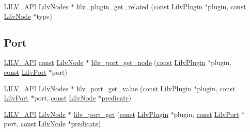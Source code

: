 \begin{DoxyCompactItemize}
\item 
\hyperlink{lilv_8h_aa5182eee7ddff96862d0171967ee6f77}{L\+I\+L\+V\+\_\+\+A\+PI} \hyperlink{lilv_8h_a256c2c4443307f320de24bb31198df83}{Lilv\+Nodes} $\ast$ \hyperlink{group__lilv_ga6070a384fbd949ec78ae7a8e323139f9}{lilv\+\_\+plugin\+\_\+get\+\_\+related} (\hyperlink{getopt1_8c_a2c212835823e3c54a8ab6d95c652660e}{const} \hyperlink{lilv_8h_a94e36303167a78a0c392f881136b461b}{Lilv\+Plugin} $\ast$plugin, \hyperlink{getopt1_8c_a2c212835823e3c54a8ab6d95c652660e}{const} \hyperlink{lilv_8h_ae183dca3dca5368d34dbd863a405437b}{Lilv\+Node} $\ast$type)
\end{DoxyCompactItemize}
\subsection*{Port}
\begin{DoxyCompactItemize}
\item 
\hyperlink{lilv_8h_aa5182eee7ddff96862d0171967ee6f77}{L\+I\+L\+V\+\_\+\+A\+PI} \hyperlink{getopt1_8c_a2c212835823e3c54a8ab6d95c652660e}{const} \hyperlink{lilv_8h_ae183dca3dca5368d34dbd863a405437b}{Lilv\+Node} $\ast$ \hyperlink{group__lilv_ga2b4217e2ea80059580f62f163b5a2df5}{lilv\+\_\+port\+\_\+get\+\_\+node} (\hyperlink{getopt1_8c_a2c212835823e3c54a8ab6d95c652660e}{const} \hyperlink{lilv_8h_a94e36303167a78a0c392f881136b461b}{Lilv\+Plugin} $\ast$plugin, \hyperlink{getopt1_8c_a2c212835823e3c54a8ab6d95c652660e}{const} \hyperlink{lilv_8h_a772dad64b72690372c1f78314012bda5}{Lilv\+Port} $\ast$port)
\item 
\hyperlink{lilv_8h_aa5182eee7ddff96862d0171967ee6f77}{L\+I\+L\+V\+\_\+\+A\+PI} \hyperlink{lilv_8h_a256c2c4443307f320de24bb31198df83}{Lilv\+Nodes} $\ast$ \hyperlink{group__lilv_ga60b499a485768d393e702f360b79e7f8}{lilv\+\_\+port\+\_\+get\+\_\+value} (\hyperlink{getopt1_8c_a2c212835823e3c54a8ab6d95c652660e}{const} \hyperlink{lilv_8h_a94e36303167a78a0c392f881136b461b}{Lilv\+Plugin} $\ast$plugin, \hyperlink{getopt1_8c_a2c212835823e3c54a8ab6d95c652660e}{const} \hyperlink{lilv_8h_a772dad64b72690372c1f78314012bda5}{Lilv\+Port} $\ast$port, \hyperlink{getopt1_8c_a2c212835823e3c54a8ab6d95c652660e}{const} \hyperlink{lilv_8h_ae183dca3dca5368d34dbd863a405437b}{Lilv\+Node} $\ast$\hyperlink{xlmath_8c_a767c5fa064d0a1e1f8b447769f1a890b}{predicate})
\item 
\hyperlink{lilv_8h_aa5182eee7ddff96862d0171967ee6f77}{L\+I\+L\+V\+\_\+\+A\+PI} \hyperlink{lilv_8h_ae183dca3dca5368d34dbd863a405437b}{Lilv\+Node} $\ast$ \hyperlink{group__lilv_ga478aacf9e903d75e219d8b7933033899}{lilv\+\_\+port\+\_\+get} (\hyperlink{getopt1_8c_a2c212835823e3c54a8ab6d95c652660e}{const} \hyperlink{lilv_8h_a94e36303167a78a0c392f881136b461b}{Lilv\+Plugin} $\ast$plugin, \hyperlink{getopt1_8c_a2c212835823e3c54a8ab6d95c652660e}{const} \hyperlink{lilv_8h_a772dad64b72690372c1f78314012bda5}{Lilv\+Port} $\ast$port, \hyperlink{getopt1_8c_a2c212835823e3c54a8ab6d95c652660e}{const} \hyperlink{lilv_8h_ae183dca3dca5368d34dbd863a405437b}{Lilv\+Node} $\ast$\hyperlink{xlmath_8c_a767c5fa064d0a1e1f8b447769f1a890b}{predicate})

\end{DoxyCompactItemize}
